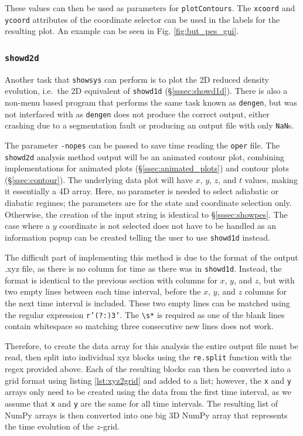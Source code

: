 \documentclass[12pt]{article}
\begin{document}
These values can then be used as parameters for \texttt{plotContours}. The \texttt{xcoord} and \texttt{ycoord} attributes of the coordinate selector can be used in the labels for the resulting plot. An example can be seen in Fig. \ref{fig:but_pes_gui}.

\subsubsection{\texttt{showd2d}}\label{sssec:showd2d}

Another task that \texttt{showsys} can perform is to plot the 2D reduced density evolution, i.e.~the 2D equivalent of \texttt{showd1d} (\S\ref{sssec:showd1d}). There is also a non-menu based program that performs the same task known as \texttt{dengen}, but was not interfaced with as \texttt{dengen} does not produce the correct output, either crashing due to a segmentation fault or producing an output file with only \texttt{NaN}s.

The parameter \texttt{-nopes} can be passed to save time reading the \texttt{oper} file. The \texttt{showd2d} analysis method output will be an animated contour plot, combining implementations for animated plots (\S\ref{ssec:animated_plots}) and contour plots (\S\ref{ssec:contour}). The underlying data plot will have \(x\), \(y\), \(z\), and \(t\) values, making it essentially a 4D array. Here, no parameter is needed to select adiabatic or diabatic regimes; the parameters are for the state and coordinate selection only. Otherwise, the creation of the input string is identical to \S\ref{sssec:showpes}. The case where a \(y\) coordinate is not selected does not have to be handled as an information popup can be created telling the user to use \texttt{showd1d} instead.

The difficult part of implementing this method is due to the format of the output .xyz file, as there is no column for time as there was in \texttt{showd1d}. Instead, the format is identical to the previous section with columns for \(x\), \(y\), and \(z\), but with two empty lines between each time interval, before the \(x\), \(y\), and \(z\) columns for the next time interval is included. These two empty lines can be matched using the regular expression \texttt{r'(?:\n\s*){3}'}. The \texttt{\textbackslash{}s*} is required as one of the blank lines contain whitespace so matching three consecutive new lines does not work.

Therefore, to create the data array for this analysis the entire output file must be read, then split into individual xyz blocks using the \texttt{re.split} function with the regex provided above. Each of the resulting blocks can then be converted into a grid format using listing \ref{lst:xyz2grid} and added to a list; however, the \texttt{x} and \texttt{y} arrays only need to be created using the data from the first time interval, as we assume that \texttt{x} and \texttt{y} are the same for all time intervals. The resulting list of NumPy arrays is then converted into one big 3D NumPy array that represents the time evolution of the \(z\)-grid.
\end{document}
